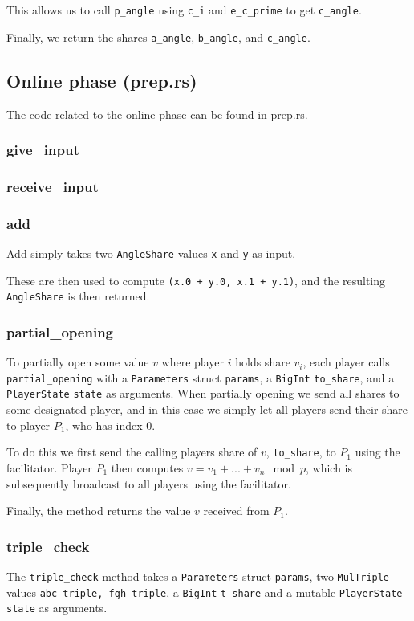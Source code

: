 \documentclass[../main.tex]{subfiles}
\begin{document}
This allows us to call \lstinline{p_angle} using \lstinline{c_i} and \lstinline{e_c_prime} to get \lstinline{c_angle}.

Finally, we return the shares \lstinline{a_angle}, \lstinline{b_angle}, and \lstinline{c_angle}.

\subsection{Online phase (prep.rs)}
The code related to the online phase can be found in prep.rs.
\subsubsection{give\_input}


\subsubsection{receive\_input}
\subsubsection{add}
Add simply takes two \lstinline{AngleShare} values \lstinline{x} and \lstinline{y} as input.

These are then used to compute \lstinline{(x.0 + y.0, x.1 + y.1)}, and the resulting \lstinline{AngleShare} is then returned.
\subsubsection{partial\_opening}
To partially open some value $v$ where player $i$ holds share $v_i$, each player calls \lstinline{partial_opening} with a \lstinline{Parameters} struct \lstinline{params}, a \lstinline{BigInt} \lstinline{to_share}, and a \lstinline{PlayerState}  \lstinline{state} as arguments. When partially opening we send all shares to some designated player, and in this case we simply let all players send their share to player $P_1$, who has index $0$.

To do this we first send the calling players share of $v$, \lstinline{to_share}, to $P_1$ using the facilitator. Player $P_1$ then computes $v = v_1 + ... + v_n \mod p$, which is subsequently broadcast to all players using the facilitator.

Finally, the method returns the value $v$ received from $P_1$.

\subsubsection{triple\_check}
The \lstinline{triple_check} method takes a \lstinline{Parameters} struct \lstinline{params}, two \lstinline{MulTriple} values \lstinline{abc_triple, fgh_triple}, a \lstinline{BigInt} \lstinline{t_share} and a mutable \lstinline{PlayerState} \lstinline{state} as arguments.
\end{document}
